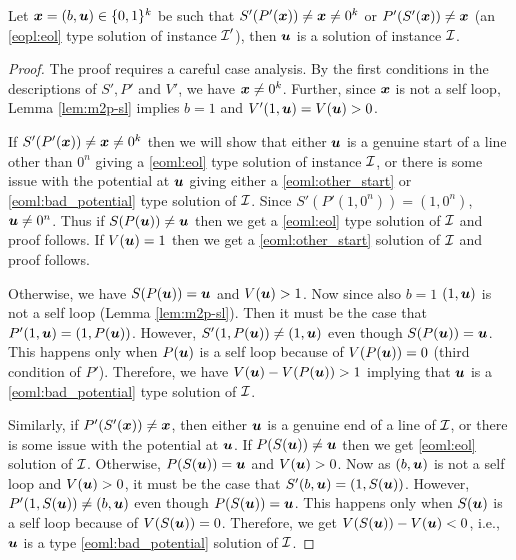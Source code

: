 \begin{lemma}\label{lem:m2p-r1}
Let $\xx=(b,\uu)\in \{0,1\}^k$ be such that $S'(P'(\xx))\neq \xx \neq 0^k$ or $P'(S'(\xx))\neq \xx$ (an \ref{eopl:eol} type solution of \EOPL instance $\CI'$), then $\uu$ is a solution of \EOML instance $\CI$.
\end{lemma}
\begin{proof}
The proof requires a careful case analysis. 
By the first conditions in the descriptions of $S',P'$ and $V'$, we have $\xx \neq 0^k$. 
Further, since $\xx$ is not a self loop, Lemma \ref{lem:m2p-sl} implies $b=1$  and $V'(1,\uu)=V(\uu)>0$.
\medskip

If $S'(P'(\xx))\neq \xx\neq 0^k$ then we will show that either $\uu$ is a genuine start of a line other than $0^n$ giving a \ref{eoml:eol} type solution of \EOML instance $\CI$, or there is some issue with the potential at $\uu$ giving either a \ref{eoml:other_start} or \ref{eoml:bad_potential} type solution of $\CI$. Since $S'(P'(1,0^n))=(1,0^n)$, $\uu \neq 0^n$. Thus if $S(P(\uu))\neq \uu$ then we get a \ref{eoml:eol} type solution of $\CI$ and proof follows. If $V(\uu)=1$ then we get a \ref{eoml:other_start} solution of $\CI$ and proof follows. 

Otherwise, we have $S(P(\uu))=\uu$ and $V(\uu)>1$. Now since also $b=1$ $(1,\uu)$ is not a self loop (Lemma \ref{lem:m2p-sl}). %
Then it must be the case that $P'(1,\uu)=(1,P(\uu))$. However, $S'(1,P(\uu))\neq (1,\uu)$ even though $S(P(\uu))=\uu$. This happens only when $P(\uu)$ is a self loop because of $V(P(\uu))=0$ (third condition of $P'$).
Therefore, we have $V(\uu)-V(P(\uu))>1$ implying that $\uu$ is a \ref{eoml:bad_potential} type solution of $\CI$. 
\medskip

Similarly, if $P'(S'(\xx))\neq \xx$, then either $\uu$ is a genuine end of a line of $\CI$, or there is some issue with the potential at $\uu$. If $P(S(\uu))\neq \uu$ then we get \ref{eoml:eol} solution of $\CI$. Otherwise, $P(S(\uu))=\uu$ and $V(\uu)>0$. Now as $(b,\uu)$ is not a self loop and $V(\uu)>0$, it must be the case that $S'(b,\uu)=(1,S(\uu))$. However, $P'(1, S(\uu))\neq (b,\uu)$ even though $P(S(\uu))=\uu$. This happens only when $S(\uu)$ is a self loop because of $V(S(\uu))=0$. Therefore, we get $V(S(\uu))-V(\uu)<0$, i.e., $\uu$ is a type \ref{eoml:bad_potential} solution of $\CI$. 
\end{proof}

